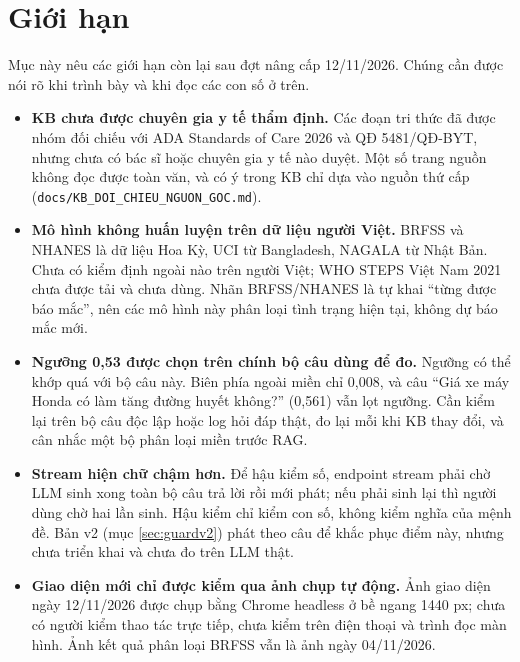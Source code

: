 \section{Giới hạn}\label{sec:gioihan}
Mục này nêu các giới hạn còn lại sau đợt nâng cấp 12/11/2026. Chúng cần được nói rõ khi trình bày và khi đọc các con số ở trên.
\begin{itemize}
\item \textbf{KB chưa được chuyên gia y tế thẩm định.} Các đoạn tri thức đã được nhóm đối chiếu với ADA Standards of Care 2026 và QĐ 5481/QĐ-BYT, nhưng chưa có bác sĩ hoặc chuyên gia y tế nào duyệt. Một số trang nguồn không đọc được toàn văn, và có ý trong KB chỉ dựa vào nguồn thứ cấp (\texttt{docs/KB\_DOI\_CHIEU\_NGUON\_GOC.md}).
\item \textbf{Mô hình không huấn luyện trên dữ liệu người Việt.} BRFSS và NHANES là dữ liệu Hoa Kỳ, UCI từ Bangladesh, NAGALA từ Nhật Bản. Chưa có kiểm định ngoài nào trên người Việt; WHO STEPS Việt Nam 2021 chưa được tải và chưa dùng. Nhãn BRFSS/NHANES là tự khai “từng được báo mắc”, nên các mô hình này phân loại tình trạng hiện tại, không dự báo mắc mới.
\item \textbf{Ngưỡng 0,53 được chọn trên chính bộ câu dùng để đo.} Ngưỡng có thể khớp quá với bộ câu này. Biên phía ngoài miền chỉ 0,008, và câu “Giá xe máy Honda có làm tăng đường huyết không?” (0,561) vẫn lọt ngưỡng. Cần kiểm lại trên bộ câu độc lập hoặc log hỏi đáp thật, đo lại mỗi khi KB thay đổi, và cân nhắc một bộ phân loại miền trước RAG.
\item \textbf{Stream hiện chữ chậm hơn.} Để hậu kiểm số, endpoint stream phải chờ LLM sinh xong toàn bộ câu trả lời rồi mới phát; nếu phải sinh lại thì người dùng chờ hai lần sinh. Hậu kiểm chỉ kiểm con số, không kiểm nghĩa của mệnh đề. Bản v2 (mục \ref{sec:guardv2}) phát theo câu để khắc phục điểm này, nhưng chưa triển khai và chưa đo trên LLM thật.
\item \textbf{Giao diện mới chỉ được kiểm qua ảnh chụp tự động.} Ảnh giao diện ngày 12/11/2026 được chụp bằng Chrome headless ở bề ngang 1440 px; chưa có người kiểm thao tác trực tiếp, chưa kiểm trên điện thoại và trình đọc màn hình. Ảnh kết quả phân loại BRFSS vẫn là ảnh ngày 04/11/2026.
\end{itemize}
